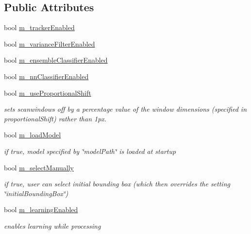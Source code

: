 \subsection*{Public Attributes}
\begin{DoxyCompactItemize}
\item 
bool \hyperlink{classtld_1_1_settings_a54a14f7a08a919ee6ff19514205c6b47}{m\_\-trackerEnabled}
\item 
bool \hyperlink{classtld_1_1_settings_ab3100039fb52ee1a41813812320a6ca3}{m\_\-varianceFilterEnabled}
\item 
bool \hyperlink{classtld_1_1_settings_af184f95560d875d91951dbbc368ba04d}{m\_\-ensembleClassifierEnabled}
\item 
bool \hyperlink{classtld_1_1_settings_a8ec793b6668a626308d8ee8d697d9f67}{m\_\-nnClassifierEnabled}
\item 
bool \hyperlink{classtld_1_1_settings_afd89a9d1a0a8dec5ce524eeed5b0f5e0}{m\_\-useProportionalShift}
\begin{DoxyCompactList}\small\item\em sets scanwindows off by a percentage value of the window dimensions (specified in proportionalShift) rather than 1px. \item\end{DoxyCompactList}\item 
bool \hyperlink{classtld_1_1_settings_a6c06df5b2a9028a1c9a77269601f4a36}{m\_\-loadModel}
\begin{DoxyCompactList}\small\item\em if true, model specified by \char`\"{}modelPath\char`\"{} is loaded at startup \item\end{DoxyCompactList}\item 
bool \hyperlink{classtld_1_1_settings_afadc64d205d5386d94088e87dba72519}{m\_\-selectManually}
\begin{DoxyCompactList}\small\item\em if true, user can select initial bounding box (which then overrides the setting \char`\"{}initialBoundingBox\char`\"{}) \item\end{DoxyCompactList}\item 
bool \hyperlink{classtld_1_1_settings_abd4a98a18a910313cf3590f507f1ceef}{m\_\-learningEnabled}
\begin{DoxyCompactList}\small\item\em enables learning while processing \item\end{DoxyCompactList}\item 

\end{DoxyCompactItemize}
